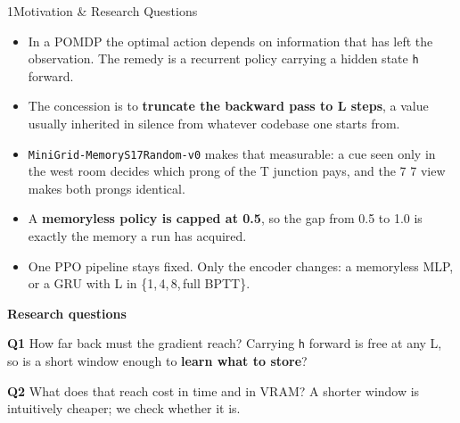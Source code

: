 \documentclass[final]{article}
\newcommand{\pbodys}{\fontsize{24}{31}\selectfont}
\newcommand{\psmall}{\fontsize{23}{30}\selectfont}
\newcommand{\Lw}{L}
\newcommand{\tx}{\texttimes}
\newcommand{\mono}[1]{\texttt{#1}}
\newlength{\lcolw}\setlength{\lcolw}{315mm}
\newlength{\colh}\setlength{\colh}{985mm}
\begin{document}
\noindent
\begin{minipage}[t][\colh][s]{\lcolw}%
\vspace*{0pt}%

\begin{panel}{1}{Motivation \& Research Questions}
  {\pbodys
   \begin{itemize}[leftmargin=8mm,itemsep=4mm,topsep=0mm,parsep=0pt]
     \item In a POMDP the optimal action depends on information that has left
           the observation. The remedy is a recurrent policy carrying a hidden
           state \mono{h} forward.
     \item The concession is to \textbf{truncate the backward pass to \Lw{}
           steps}, a value usually inherited in silence from whatever codebase
           one starts from.
     \item \mono{MiniGrid-MemoryS17Random-v0} makes that measurable: a cue seen
           only in the west room decides which prong of the T junction pays,
           and the 7\,\tx\,7 view makes both prongs identical.
     \item A \textbf{memoryless policy is capped at 0.5}, so the gap from 0.5
           to 1.0 is exactly the memory a run has acquired.
     \item One PPO pipeline stays fixed. Only the encoder changes: a memoryless
           MLP, or a GRU with \Lw{} in \{1,\,4,\,8,\,full BPTT\}.
   \end{itemize}\par}
  \vspace{6mm}

  \begin{callout}
    {\psmall\color{luhblue}
     \textbf{Research questions}\par
     \vspace{3mm}
     \textbf{Q1} How far back must the gradient reach? Carrying \mono{h}
     forward is free at any \Lw, so is a short window enough to \textbf{learn
     what to store}?\par
     \vspace{3mm}
     \textbf{Q2} What does that reach cost in time and in VRAM? A shorter
     window is intuitively cheaper; we check whether it is.\par}
  \end{callout}
  \vspace{7mm}


\end{panel}
\end{minipage}
\end{document}
